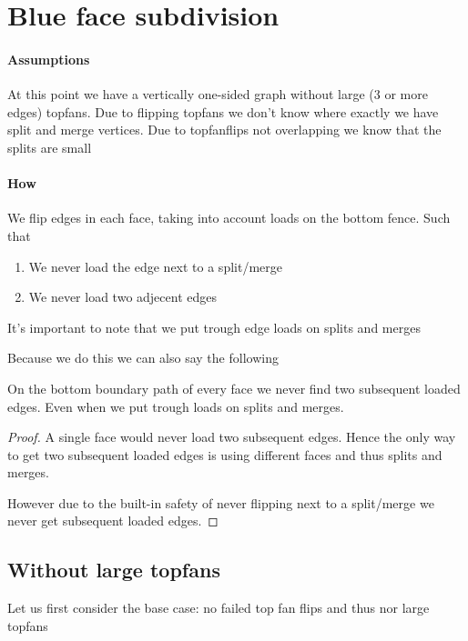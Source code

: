 
\section{Blue face subdivision}

\paragraph{Assumptions}
At this point we have a vertically one-sided graph without large (3 or more edges) topfans. Due to flipping topfans we don't know where exactly we have split and merge vertices. Due to topfanflips not overlapping we know that the splits are small 


\paragraph{How}
We flip edges in each face, taking into account loads on the bottom fence. Such that

\begin{enumerate}
  \item We never load the edge next to a split/merge
  \item We never load two adjecent edges
\end{enumerate}

It's important to note that we put trough edge loads on splits and merges

Because we do this we can also say the following

\begin{lemma}
  \label{lm:}
  On the bottom boundary path of every face we never find two subsequent loaded edges. Even when we put trough loads on splits and merges.
\end{lemma}
\begin{proof}
  A single face would never load two subsequent edges. Hence the only way to get two subsequent loaded edges is using different faces and thus splits and merges.

  However due to the built-in safety of never flipping next to a split/merge we never get subsequent    loaded edges.
\end{proof}


\subsection{Without large topfans}
Let us first consider the base case: no failed top fan flips and thus nor large topfans

